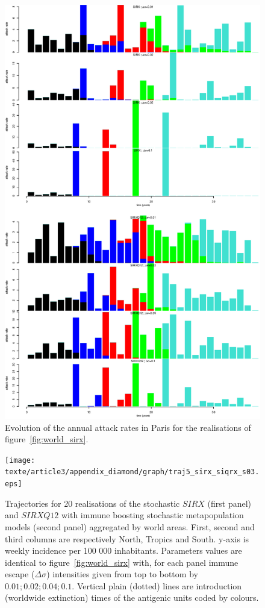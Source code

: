 \begin{figure}[!hp]
  \center
  \includegraphics[width=0.9\linewidth]{texte/article3/appendix_diamond/graph/barplot.eps}
  \caption{Evolution of the annual attack rates in Paris for the
    realisations of figure~\ref{fig:world_sirx}.}
  \label{fig:attack_rate_metapop}
\end{figure}



\begin{figure}[!hp]
  \center
  \texttt{[image: texte/article3/appendix\_diamond/graph/traj5\_sirx\_siqrx\_s03.eps]}
  \caption{Trajectories for 20 realisations of the stochastic $SIRX$
    (first panel) and $SIRXQ12$ with immune boosting stochastic
    metapopulation models (second panel) aggregated by world
    areas. First, second and third columns are respectively North,
    Tropics and South. y-axis is weekly incidence per 100 000
    inhabitants. Parameters values are identical to
    figure~\ref{fig:world_sirx} with, for each panel immune escape
    ($\Delta\sigma$) intensities given from top to bottom by $0.01;
    0.02; 0.04; 0.1$. Vertical plain (dotted) lines are introduction
    (worldwide extinction) times of the antigenic units coded by
    colours.}
  \label{fig:aggreg_metapop}
\end{figure}


